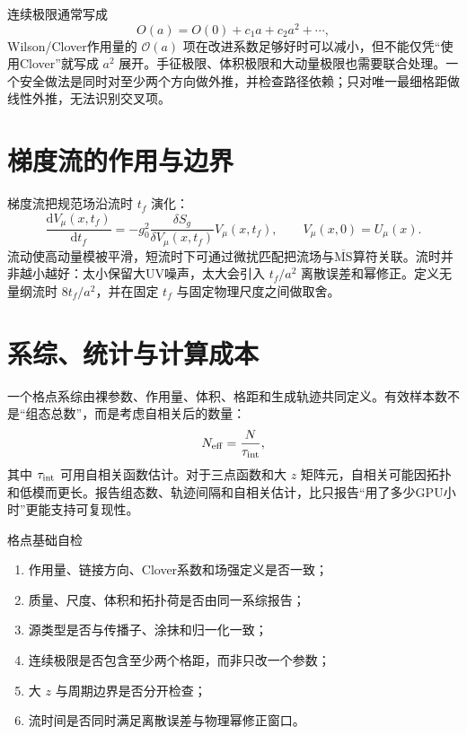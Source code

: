 \documentclass[UTF8,12pt,a4paper,twoside,openany]{ctexbook}
\newcommand{\MSbar}{\overline{\mathrm{MS}}}
\newcommand{\dd}{\mathrm{d}}
\begin{document}
连续极限通常写成
\begin{equation}
  O(a)=O(0)+c_1a+c_2a^2+\cdots,
  \label{eq:continuum-expansion}
\end{equation}
Wilson/Clover作用量的 \(\mathcal O(a)\) 项在改进系数足够好时可以减小，但不能仅凭“使用Clover”就写成 \(a^2\) 展开。手征极限、体积极限和大动量极限也需要联合处理。一个安全做法是同时对至少两个方向做外推，并检查路径依赖；只对唯一最细格距做线性外推，无法识别交叉项。

\section{梯度流的作用与边界}

梯度流把规范场沿流时 \(t_f\) 演化：
\begin{equation}
  \frac{\dd V_\mu(x,t_f)}{\dd t_f}
  =-g_0^2\frac{\delta S_g}{\delta V_\mu(x,t_f)}V_\mu(x,t_f),
  \qquad
  V_\mu(x,0)=U_\mu(x).
  \label{eq:flow-equation-intro}
\end{equation}
流动使高动量模被平滑，短流时下可通过微扰匹配把流场与\(\MSbar\)算符关联。流时并非越小越好：太小保留大UV噪声，太大会引入 \(t_f/a^2\) 离散误差和幂修正。定义无量纲流时 \(8t_f/a^2\)，并在固定 \(t_f\) 与固定物理尺度之间做取舍。

\section{系综、统计与计算成本}

一个格点系综由裸参数、作用量、体积、格距和生成轨迹共同定义。有效样本数不是“组态总数”，而是考虑自相关后的数量：
\begin{equation}
  N_{\rm eff}=\frac{N}{\tau_{\rm int}},
  \label{eq:lattice-neff}
\end{equation}
其中 \(\tau_{\rm int}\) 可用自相关函数估计。对于三点函数和大 \(z\) 矩阵元，自相关可能因拓扑和低模而更长。报告组态数、轨迹间隔和自相关估计，比只报告“用了多少GPU小时”更能支持可复现性。

\begin{checkpointbox}{格点基础自检}
\begin{enumerate}
  \item 作用量、链接方向、Clover系数和场强定义是否一致；
  \item 质量、尺度、体积和拓扑荷是否由同一系综报告；
  \item 源类型是否与传播子、涂抹和归一化一致；
  \item 连续极限是否包含至少两个格距，而非只改一个参数；
  \item 大 \(z\) 与周期边界是否分开检查；
  \item 流时间是否同时满足离散误差与物理幂修正窗口。
\end{enumerate}
\end{checkpointbox}
\end{document}
